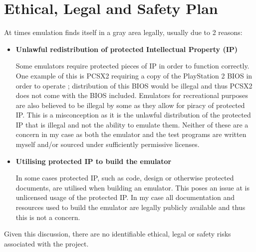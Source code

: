 \section{Ethical, Legal and Safety Plan}

At times emulation finds itself in a gray area legally, usually due to 2 reasons:

\begin{itemize}
    \item \textbf{Unlawful redistribution of protected Intellectual Property (IP)} %
    
    Some emulators require protected pieces of IP in order to function correctly. One example of this is PCSX2 requiring a copy of the PlayStation 2 BIOS in order to operate \cite{PCSX2-getting-started}; distribution of this BIOS would be illegal and thus PCSX2 does not come with the BIOS included. Emulators for recreational purposes are also believed to be illegal by some as they allow for piracy of protected IP. This is a misconception as it is the unlawful distribution of the protected IP that is illegal and not the ability to emulate them. Neither of these are a concern in my case as both the emulator and the test programs are written myself and/or sourced under sufficiently permissive licenses.

    \item \textbf{Utilising protected IP to build the emulator} %
    
    In some cases protected IP, such as code, design or otherwise protected documents, are utilised when building an emulator. This poses an issue at is unlicensed usage of the protected IP. In my case all documentation and resources used to build the emulator are legally publicly available and thus this is not a concern.
\end{itemize}

Given this discussion, there are no identifiable ethical, legal or safety risks associated with the project.
